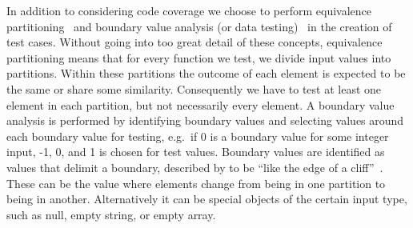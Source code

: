 In addition to considering code coverage we choose to perform equivalence partitioning~\cite[pp.~67-69]{Patton05} and boundary value analysis (or data testing)~\cite[pp.~70-79]{Patton05} in the creation of test cases.
Without going into too great detail of these concepts, equivalence partitioning means that for every function we test, we divide input values into partitions.
Within these partitions the outcome of each element is expected to be the same or share some similarity.
Consequently we have to test at least one element in each partition, but not necessarily every element.
A boundary value analysis is performed by identifying boundary values and selecting values around each boundary value for testing, e.g.\ if 0 is a boundary value for some integer input, -1, 0, and 1 is chosen for test values.
Boundary values are identified as values that delimit a boundary, described by \citeauthor{Patton05} to be ``like the edge of a cliff''~\cite[p.~71]{Patton05}.
These can be the value where elements change from being in one partition to being in another.
Alternatively it can be special objects of the certain input type, such as null, empty string, or empty array.